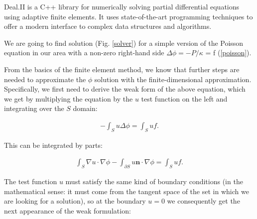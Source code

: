 \documentclass[]{pracamgr}
\begin{document}
      Deal.II\cite{dealII94} is a C++ library for numerically solving partial differential equations using adaptive finite elements. It uses state-of-the-art programming techniques to offer a modern interface to complex data structures and algorithms.

      We are going to find solution (Fig. \ref{solver}) for a simple version of the Poisson equation in our area with a non-zero right-hand side $\Delta \phi = -P/\kappa$ = f (\ref{poisson}).

      From the basics of the finite element method, we know that further steps are needed to approximate the $\phi$ solution with the finite-dimensional approximation. Specifically, we first need to derive the weak form of the above equation, which we get by multiplying the equation by the $u$ test function on the left and integrating over the $S$ domain:
      
      \begin{align*}
        -\int_S u \Delta \phi = \int_S u f.
      \end{align*}
      
      This can be integrated by parts:
      
      \begin{align*}
        \int_S \nabla u \cdot \nabla \phi
        -
        \int_{\partial S} u \mathbf{n}\cdot \nabla \phi
         = \int_S u f.
      \end{align*}
      
      The test function $u$ must satisfy the same kind of boundary conditions (in the mathematical sense: it must come from the tangent space of the set in which we are looking for a solution), so at the boundary $u=0$ we consequently get the next appearance of the weak formulation:
      
\end{document}
